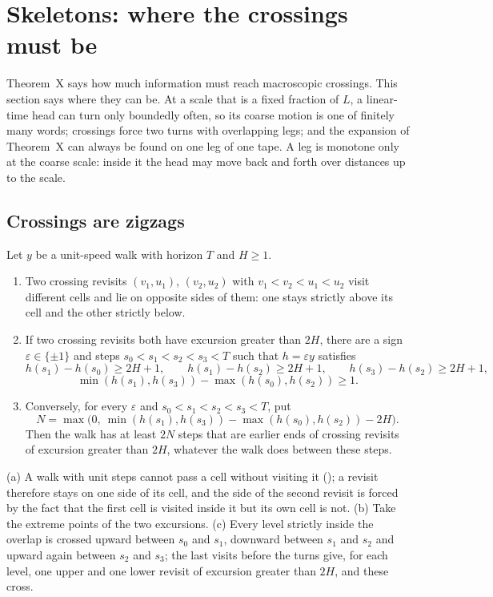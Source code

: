 \section{Skeletons: where the crossings must be}\label{sec:skeletons}

Theorem~X says how much information must reach macroscopic crossings. This section says where they can be. At a scale that is
a fixed fraction of $L$, a linear-time head can turn only boundedly often, so its coarse motion is one of finitely many words;
crossings force two turns with overlapping legs; and the expansion of Theorem~X can always be found on one leg of one tape. A leg is
monotone only at the coarse scale: inside it the head may move back and forth over distances up to the scale.

\subsection{Crossings are zigzags}

\begin{lemma}\label{lem:zigzag}
Let $y$ be a unit-speed walk with horizon $T$ and $H\ge1$.
\begin{enumerate}[label=(\alph*)]
\item Two crossing revisits $(v_1,u_1)$, $(v_2,u_2)$ with $v_1<v_2<u_1<u_2$ visit different cells and lie on opposite sides of them:
one stays strictly above its cell and the other strictly below.
\item If two crossing revisits both have excursion greater than $2H$, there are a sign $\varepsilon\in\{\pm1\}$ and steps
$s_0<s_1<s_2<s_3<T$ such that $h=\varepsilon y$ satisfies
\[
  h(s_1)-h(s_0)\ge2H+1,\qquad h(s_1)-h(s_2)\ge2H+1,\qquad h(s_3)-h(s_2)\ge2H+1,
\]
\[
  \min(h(s_1),h(s_3))-\max(h(s_0),h(s_2))\ge1 .
\]
\item Conversely, for every $\varepsilon$ and $s_0<s_1<s_2<s_3<T$, put
\[
  N=\max\bigl(0,\ \min(h(s_1),h(s_3))-\max(h(s_0),h(s_2))-2H\bigr).
\]
Then the walk has at least $2N$ steps that are earlier ends of crossing revisits of excursion greater than $2H$, whatever the walk
does between these steps.
\end{enumerate}
\end{lemma}

\begin{outline}
(a) A walk with unit steps cannot pass a cell without visiting it (); a revisit therefore stays on one side of its
cell, and the side of the second revisit is forced by the fact that the first cell is visited inside it but its own cell is not.
(b) Take the extreme points of the two excursions. (c) Every level strictly inside the overlap is crossed upward between $s_0$ and
$s_1$, downward between $s_1$ and $s_2$ and upward again between $s_2$ and $s_3$; the last visits before the turns give, for each
level, one upper and one lower revisit of excursion greater than $2H$, and these cross.
\end{outline}

